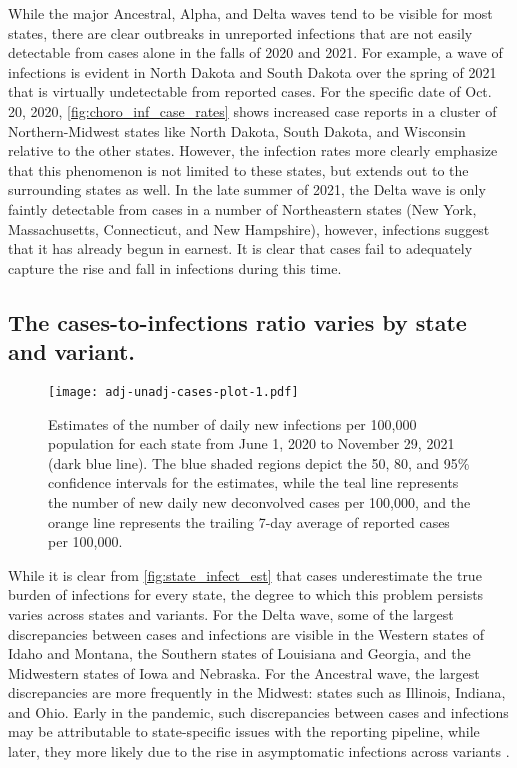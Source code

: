 While the major Ancestral, Alpha, and Delta waves tend to be visible for most
states, there are clear outbreaks in unreported infections that are not easily
detectable from cases alone in the falls of 2020 and 2021. For example, a wave 
of infections is evident in North Dakota and South Dakota over the spring of 2021
that is virtually undetectable from reported cases. For the specific date
of Oct. 20, 2020, \autoref{fig:choro_inf_case_rates} shows increased case
reports in a cluster of Northern-Midwest states like North Dakota, South Dakota,
and Wisconsin relative to the other states. However, the infection rates more clearly
emphasize that this phenomenon is not limited to these states, but extends out
to the surrounding states as well. In the late summer of 2021, the
Delta wave is only faintly detectable from cases in a number of Northeastern
states (New York, Massachusetts, Connecticut, and New Hampshire), however,
infections suggest that it has already begun in earnest. It is clear that cases fail to
adequately capture the rise and fall in infections during this time.

\subsection{The cases-to-infections ratio varies by state and variant.}
\label{sec:case-infection-ratio}

\begin{figure}[!tb]
\centering
\texttt{[image: adj-unadj-cases-plot-1.pdf]} 
\caption{Estimates of the number of daily new infections per 100,000
population for each \US state from June 1, 2020 to November 29, 2021
(dark blue line). The blue shaded regions depict the 50, 80, and 95\%
confidence intervals for the estimates, while the teal line represents
the number of new daily new deconvolved cases per 100,000, and the
orange line represents the trailing 7-day average of reported cases per
100,000.}
\label{fig:state_infect_est}
\end{figure}    

While it is clear from \autoref{fig:state_infect_est} that cases underestimate
the true burden of infections for every state, the degree to which this problem
persists varies across states and variants. For the Delta wave, some of the
largest discrepancies between cases and infections are visible in the Western
states of Idaho and Montana, the Southern states of Louisiana and Georgia, and
the Midwestern states of Iowa and Nebraska. For the Ancestral wave, the largest
discrepancies are more frequently in the Midwest: states such as Illinois,
Indiana, and Ohio. Early in the pandemic, such discrepancies between cases and
infections may be attributable to state-specific issues with the reporting
pipeline, while later, they more likely due to the rise in asymptomatic
infections across variants \citep{oph2022covid, garrett2022high}. 

